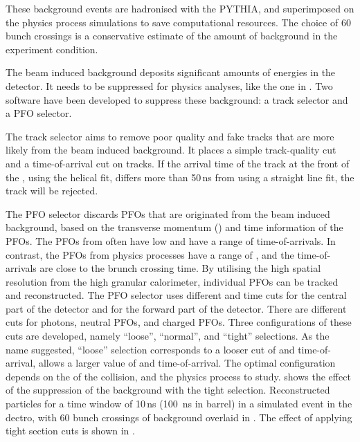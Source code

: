 These \ggHad background events are hadronised with the PYTHIA, and superimposed on the physics process simulations to save computational resources. The choice of 60 bunch crossings is a conservative estimate  of  the amount of background in the experiment condition\cite{Barklow:1443518,Barklow:1443518}.

The beam induced background deposits significant amounts of energies in the detector. It needs to be suppressed for physics analyses, like the one in . Two software have been developed to suppress these background: a track selector and a PFO selector\cite{Marshall:2012ry}.

The track selector aims to remove poor quality and fake tracks that are more likely from the beam induced background. It places a simple track-quality cut and a time-of-arrival cut on tracks. If the arrival time of the track at the front of the \ECAL, using the helical fit, differs more than 50\,ns from using a straight line fit, the track will be rejected.


The PFO selector discards PFOs that are originated from the beam induced background, based on the transverse momentum (\pT) and time information of the PFOs. The PFOs from \ggHad often have low \pT and have a range of time-of-arrivals. In contrast, the PFOs from physics processes have a range of \pT, and the time-of-arrivals are close to the brunch crossing time. By utilising the high spatial resolution from the high granular calorimeter, individual PFOs can be tracked and reconstructed. The PFO selector uses different \pT and time cuts for the central part of the detector and for the forward part of the detector. There are different cuts for photons, neutral PFOs, and charged PFOs. Three configurations of these cuts are developed, namely ``loose'', ``normal'', and ``tight'' selections. As the name suggested, ``loose'' selection corresponds to a looser cut of \pT and time-of-arrival, allows a larger value of \pT and time-of-arrival. The optimal configuration depends on the \sqrtS of the collision, and the physics process to study.  shows the effect of the suppression of the background with the tight \PFO selection. Reconstructed particles for a time window of 10\,ns (100 \,ns in \HCAL barrel) in a simulated \HepProcess{\Pep\Pem \to \PHiggs\PHiggs \to \Ptop\APbottom\Pbottom\APtop} event in the \CLICILD dectro, with 60 bunch crossings of \ggHad background overlaid in . The effect of applying tight \PFO section cuts is shown in .


